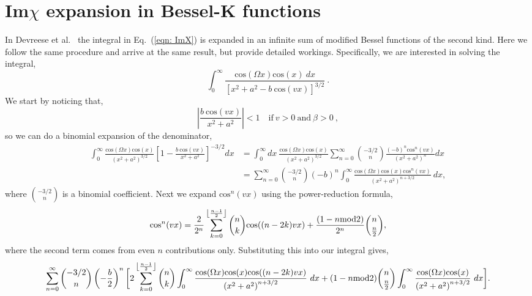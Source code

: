 \section{Im$\chi$ expansion in Bessel-K functions} 

In Devreese et al.~\cite{devreese_optical_1972} the integral in Eq.~(\ref{eqn: ImX}) is expanded in an infinite sum of modified Bessel functions of the second kind. Here we follow the same procedure and arrive at the same result, but provide detailed workings. Specifically, we are interested in solving the integral,
\begin{equation} \label{eqn: imx_integral}
    \int_0^\infty \frac{\textrm{cos}(\Omega x) \textrm{cos}(x)\ dx}{\left[x^2 + a^2 - b\ \textrm{cos}(vx) \right]^{3/2}}\ .
\end{equation}
We start by noticing that,
\begin{equation} \label{eqn: inequality}
    \left| \frac{b\ \textrm{cos}(vx)}{x^2 + a^2} \right| < 1 \quad \textrm{if}\ v > 0\ \textrm{and}\ \beta > 0\ ,
\end{equation}
so we can do a binomial expansion of the denominator,
\begin{equation}
    \begin{aligned}
        \int_0^\infty \frac{\textrm{cos}(\Omega x) \textrm{cos}(x)}{\left(x^2 + a^2\right)^{3/2}} \left[ 1 - \frac{b\ \textrm{cos}(vx)}{x^2 + a^2}\right]^{-3/2}dx &= \int_0^\infty dx\ \frac{\textrm{cos}(\Omega x) \textrm{cos}(x)}{\left(x^2 + a^2\right)^{3/2}} \sum_{n=0}^\infty \binom{-3/2}{n} \frac{(-b)^n \textrm{cos}^n(vx)}{\left( x^2 + a^2 \right)^n}dx\\
        &= \sum_{n=0}^\infty \binom{-3/2}{n} (-b)^n \int_0^\infty \frac{\textrm{cos}(\Omega x) \textrm{cos}(x) \textrm{cos}^n(vx)}{\left(x^2 + a^2\right)^{n + 3/2}}\ dx,
    \end{aligned}
\end{equation}
where $\binom{-3/2}{n}$ is a binomial coefficient. Next we expand $\textrm{cos}^n(vx)$ using the power-reduction formula,
\begin{equation}
    \begin{gathered}
        \textrm{cos}^n(vx) = \frac{2}{2^n} \sum_{k=0}^{\floor*{\frac{n-1}{2}}} \binom{n}{k} \textrm{cos}((n -2k)vx) + \frac{(1-n\textrm{mod}2)}{2^{n}} \binom{n}{\frac{n}{2}},
    \end{gathered}
\end{equation}
where the second term comes from even $n$ contributions only. Substituting this into our integral gives,
\begin{equation}
    \begin{gathered}
        \sum_{n=0}^\infty \binom{-3/2}{n} \left(-\frac{b}{2}\right)^n \bigg[
        2 \sum_{k=0}^{\floor*{\frac{n-1}{2}}} \binom{n}{k} \int_0^\infty \frac{\textrm{cos}(\Omega x) \textrm{cos}(x) \textrm{cos}((n -2k)vx)}{\left(x^2 + a^2\right)^{n + 3/2}}\ dx
        + (1-n\textrm{mod}2) \binom{n}{\frac{n}{2}} \int_0^\infty \frac{\textrm{cos}(\Omega x) \textrm{cos}(x)}{\left(x^2 + a^2\right)^{n + 3/2}}\ dx \bigg].
    \end{gathered}
\end{equation}
